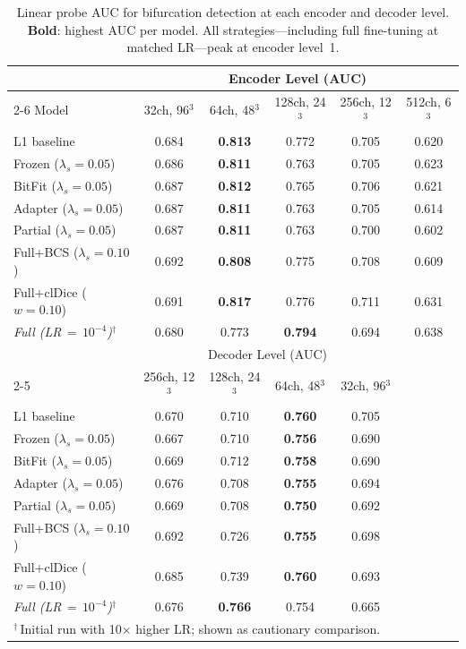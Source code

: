 \documentclass[runningheads]{llncs}
\begin{document}
\begin{table}[t]
\caption{Linear probe AUC for bifurcation detection at each encoder and decoder level. \textbf{Bold}: highest AUC per model. All strategies---including full fine-tuning at matched LR---peak at encoder level~1.}
\label{tab:probe}
\centering
\small
\begin{tabular}{lccccc}
\toprule
 & \multicolumn{5}{c}{Encoder Level (AUC)} \\
\cmidrule(lr){2-6}
Model & 32ch, 96$^3$ & 64ch, 48$^3$ & 128ch, 24$^3$ & 256ch, 12$^3$ & 512ch, 6$^3$ \\
\midrule
L1 baseline             & 0.684 & \textbf{0.813} & 0.772 & 0.705 & 0.620 \\
Frozen ($\lambda_s{=}0.05$)  & 0.686 & \textbf{0.811} & 0.763 & 0.705 & 0.623 \\
BitFit ($\lambda_s{=}0.05$)  & 0.687 & \textbf{0.812} & 0.765 & 0.706 & 0.621 \\
Adapter ($\lambda_s{=}0.05$) & 0.687 & \textbf{0.811} & 0.763 & 0.705 & 0.614 \\
Partial ($\lambda_s{=}0.05$) & 0.687 & \textbf{0.811} & 0.763 & 0.700 & 0.602 \\
\midrule
Full+BCS ($\lambda_s{=}0.10$)   & 0.692 & \textbf{0.808} & 0.775 & 0.708 & 0.609 \\
Full+clDice ($w{=}0.10$)        & 0.691 & \textbf{0.817} & 0.776 & 0.711 & 0.631 \\
\rowcolor{gray!15}
\textit{Full (LR$\,{=}\,10^{-4}$)$^\dagger$} & 0.680 & 0.773 & \textbf{0.794} & 0.694 & 0.638 \\
\midrule
 & \multicolumn{4}{c}{Decoder Level (AUC)} & \\
\cmidrule(lr){2-5}
 & 256ch, 12$^3$ & 128ch, 24$^3$ & 64ch, 48$^3$ & 32ch, 96$^3$ & \\
\midrule
L1 baseline             & 0.670 & 0.710 & \textbf{0.760} & 0.705 & \\
Frozen ($\lambda_s{=}0.05$)  & 0.667 & 0.710 & \textbf{0.756} & 0.690 & \\
BitFit ($\lambda_s{=}0.05$)  & 0.669 & 0.712 & \textbf{0.758} & 0.690 & \\
Adapter ($\lambda_s{=}0.05$) & 0.676 & 0.708 & \textbf{0.755} & 0.694 & \\
Partial ($\lambda_s{=}0.05$) & 0.669 & 0.708 & \textbf{0.750} & 0.692 & \\
\midrule
Full+BCS ($\lambda_s{=}0.10$)   & 0.692 & 0.726 & \textbf{0.755} & 0.698 & \\
Full+clDice ($w{=}0.10$)        & 0.685 & 0.739 & \textbf{0.760} & 0.693 & \\
\rowcolor{gray!15}
\textit{Full (LR$\,{=}\,10^{-4}$)$^\dagger$} & 0.676 & \textbf{0.766} & 0.754 & 0.665 & \\
\bottomrule
\multicolumn{6}{l}{\footnotesize $^\dagger$\,Initial run with 10$\times$ higher LR; shown as cautionary comparison.} \\
\end{tabular}
\end{table}
\end{document}
